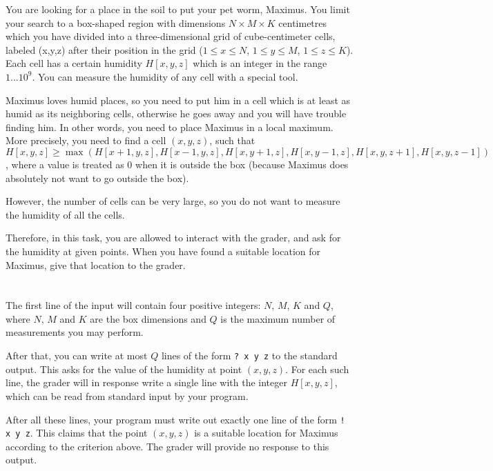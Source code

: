 \ifx\boi\undefined\fi
\def\version{jury-draft}

You are looking for a place in the soil to put your pet worm, Maximus. You limit your search to a box-shaped region with dimensions $N \times M \times K$ centimetres which you have divided into a three-dimensional grid of cube-centimeter cells, labeled (x,y,z) after their position in the grid ($1 \le x \le N$, $1 \le y \le M$, $1 \le z \le K$). Each cell has a certain humidity $H[x,y,z]$ which is an integer in the range $1 \dots 10^9$. You can measure the humidity of any cell with a special tool.  

Maximus loves humid places, so you need to put him in a cell which is at least as humid as its neighboring cells, otherwise he goes away and you will have trouble finding him. In other words, you need to place Maximus in a local maximum. More precisely, you need to find a cell $(x,y,z)$, such that $H[x,y,z] \ge \max(H[x+1, y, z], H[x-1,y,z], H[x,y+1,z], H[x,y-1,z],H[x,y,z+1],H[x,y,z-1] )$, where a value is treated as $0$ when it is outside the box (because Maximus does absolutely not want to go outside the box).

However, the number of cells can be very large, so you do not want to measure the humidity of all the cells.

Therefore, in this task, you are allowed to interact with the grader, and ask for the humidity at given points.
When you have found a suitable location for Maximus, give that location to the grader.

\section*{\interactivity}
The first line of the input will contain four positive integers: $N$, $M$, $K$ and $Q$, where $N$, $M$ and $K$ are the box dimensions and $Q$ is the maximum number of measurements you may perform.

After that, you can write at most $Q$ lines of the form \texttt{? x y z} to the standard output.
This asks for the value of the humidity at point $(x, y, z)$.
For each such line, the grader will in response write a single line with the integer $H[x,y,z]$, which can be read from standard input by your program.

After all these lines, your program must write out exactly one line of the form \texttt{! x y z}.
This claims that the point $(x, y, z)$ is a suitable location for Maximus according to the criterion above.
The grader will provide no response to this output.

